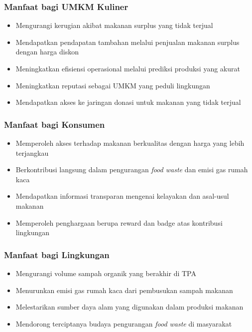 \subsubsection{Manfaat bagi UMKM Kuliner}
\begin{itemize}[leftmargin=*]
    \item Mengurangi kerugian akibat makanan surplus yang tidak terjual
    \item Mendapatkan pendapatan tambahan melalui penjualan makanan surplus dengan harga diskon
    \item Meningkatkan efisiensi operasional melalui prediksi produksi yang akurat
    \item Meningkatkan reputasi sebagai UMKM yang peduli lingkungan
    \item Mendapatkan akses ke jaringan donasi untuk makanan yang tidak terjual
\end{itemize}

\subsubsection{Manfaat bagi Konsumen}
\begin{itemize}[leftmargin=*]
    \item Memperoleh akses terhadap makanan berkualitas dengan harga yang lebih terjangkau
    \item Berkontribusi langsung dalam pengurangan \textit{food waste} dan emisi gas rumah kaca
    \item Mendapatkan informasi transparan mengenai kelayakan dan asal-usul makanan
    \item Memperoleh penghargaan berupa reward dan badge atas kontribusi lingkungan
\end{itemize}

\subsubsection{Manfaat bagi Lingkungan}
\begin{itemize}[leftmargin=*]
    \item Mengurangi volume sampah organik yang berakhir di TPA
    \item Menurunkan emisi gas rumah kaca dari pembusukan sampah makanan
    \item Melestarikan sumber daya alam yang digunakan dalam produksi makanan
    \item Mendorong terciptanya budaya pengurangan \textit{food waste} di masyarakat
\end{itemize}

